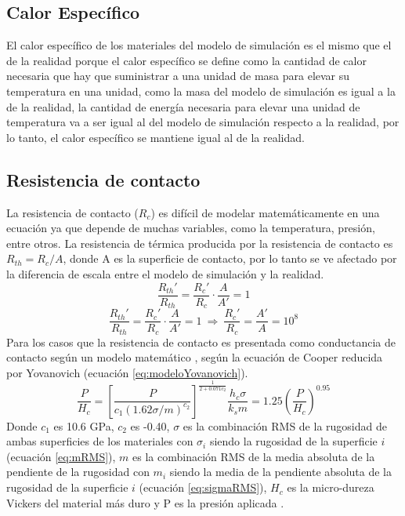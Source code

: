 \subsection{Calor Específico}
El calor específico de los materiales del modelo de simulación es el mismo que el de la realidad porque el calor específico se define como la cantidad de calor necesaria que hay que suministrar a una unidad de masa para elevar su temperatura en una unidad, como la masa del modelo de simulación es igual a la de la realidad, la cantidad de energía necesaria para elevar una unidad de temperatura va a ser igual al del modelo de simulación respecto a la realidad, por lo tanto, el calor específico se mantiene igual al de la realidad.
\subsection{Resistencia de contacto}
La resistencia de contacto ($R_c$) es difícil de modelar matemáticamente en una ecuación ya que depende de muchas variables, como la temperatura, presión, entre otros. La resistencia de térmica producida por la resistencia de contacto es $R_{th}=R_{c}/A$, donde A es la superficie de contacto, por lo tanto se ve afectado por la diferencia de escala entre el modelo de simulación y la realidad.
\[ \dfrac{R_{th}'}{R_{th}}=\dfrac{R_c'}{R_c}\cdot \dfrac{A}{A'}=1 \]
\begin{equation}
	\dfrac{R_{th}'}{R_{th}}=\dfrac{R_c'}{R_c}\cdot \dfrac{A}{A'}=1 \ \Longrightarrow \  \dfrac{R_c'}{R_c}=\dfrac{A'}{A}=10^8
	\label{eq:relacion_Rc}
\end{equation}
Para los casos que la resistencia de contacto es presentada como conductancia de contacto según un modelo matemático \cite{experimental_Rc_SS}, según la ecuación de Cooper reducida por Yovanovich (ecuación \ref{eq:modeloYovanovich}).
\begin{subequations}
\begin{equation}
\dfrac{P}{H_c}=\left[ \dfrac{P}{c_1\left(1.62\sigma/m\right)^{c_2}} \right]^{\frac{1}{2+0.071c_2}}
\label{eq:modeloYovanovich}
\end{equation}
\begin{equation}
\dfrac{h_c\sigma}{k_sm}=1.25\left(\dfrac{P}{H_c}\right)^{0.95}
\label{eq:correlacionCooperSimplificadaYovanovich}
\end{equation}
\label{eqs:ecuacionesRcYovanovich}
\end{subequations}
Donde $c_1$ es 10.6 GPa, $c_2$ es -0.40, $\sigma$ es la combinación RMS de la rugosidad de ambas superficies de los materiales con $\sigma_i$ siendo la rugosidad de la superficie $i$ (ecuación \ref{eq:mRMS}), $m$ es la combinación RMS de la media absoluta de la pendiente de la rugosidad con $m_i$ siendo la media de la pendiente absoluta de la rugosidad de la superficie $i$ (ecuación \ref{eq:sigmaRMS}), $H_c$ es la micro-dureza Vickers del material más duro y P es la presión aplicada \cite{experimental_Rc_SS}.
